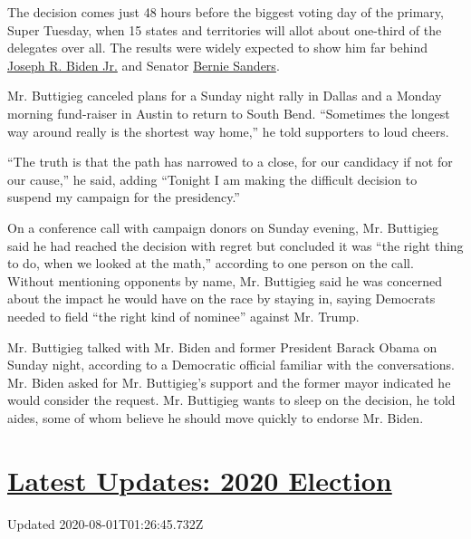 The decision comes just 48 hours before the biggest voting day of the
primary, Super Tuesday, when 15 states and territories will allot about
one-third of the delegates over all. The results were widely expected to
show him far behind
\href{https://www.nytimes.com/interactive/2020/us/elections/joe-biden.html}{Joseph
R. Biden Jr.} and Senator
\href{https://www.nytimes.com/interactive/2020/us/elections/bernie-sanders.html}{Bernie
Sanders}.

Mr. Buttigieg canceled plans for a Sunday night rally in Dallas and a
Monday morning fund-raiser in Austin to return to South Bend.
``Sometimes the longest way around really is the shortest way home,'' he
told supporters to loud cheers.

``The truth is that the path has narrowed to a close, for our candidacy
if not for our cause,'' he said, adding ``Tonight I am making the
difficult decision to suspend my campaign for the presidency.''

On a conference call with campaign donors on Sunday evening, Mr.
Buttigieg said he had reached the decision with regret but concluded it
was ``the right thing to do, when we looked at the math,'' according to
one person on the call. Without mentioning opponents by name, Mr.
Buttigieg said he was concerned about the impact he would have on the
race by staying in, saying Democrats needed to field ``the right kind of
nominee'' against Mr. Trump.

Mr. Buttigieg talked with Mr. Biden and former President Barack Obama on
Sunday night, according to a Democratic official familiar with the
conversations. Mr. Biden asked for Mr. Buttigieg's support and the
former mayor indicated he would consider the request. Mr. Buttigieg
wants to sleep on the decision, he told aides, some of whom believe he
should move quickly to endorse Mr. Biden.

\hypertarget{latest-updates-2020-election}{%
\section{\texorpdfstring{\href{https://www.nytimes.com/2020/07/31/us/elections/biden-vs-trump.html?action=click\&pgtype=Article\&state=default\&region=MAIN_CONTENT_1\&context=storylines_live_updates}{Latest
Updates: 2020
Election}}{Latest Updates: 2020 Election}}\label{latest-updates-2020-election}}

Updated 2020-08-01T01:26:45.732Z

